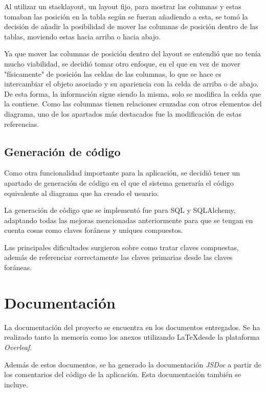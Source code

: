 Al utilizar un stacklayout, un layout fijo, para mostrar las columnas y estas tomaban las posición en la tabla según se fueran añadiendo a esta, se tomó la decisión de añadir la posibilidad de mover las columnas de posición dentro de las tablas, moviendo estas hacia arriba o hacia abajo.

Ya que mover las columnas de posición dentro del layout se entendió que no tenía mucho viabilidad, se decidió tomar otro enfoque, en el que en vez de mover "físicamente" de posición las celdas de las columnas, lo que se hace es intercambiar el objeto asociado y su apariencia con la celda de arriba o de abajo. De esta forma, la información sigue siendo la misma, solo se modifica la celda que la contiene. Como las columnas tienen relaciones cruzadas con otros elementos del diagrama, uno de los apartados más destacados fue la modificación de estas referencias.

\subsection{Generación de código}

Como otra funcionalidad importante para la aplicación, se decidió tener un apartado de generación de código en el que el sistema generaría el código equivalente al diagrama que ha creado el usuario.

La generación de código que se implementó fue para SQL y SQLAlchemy, adaptando todas las mejoras mencionadas anteriormente para que se tengan en cuenta cosas como claves foráneas y uniques compuestos.

Las principales dificultades surgieron sobre como tratar claves compuestas, además de referenciar correctamente las claves primarias desde las claves foráneas.

\section{Documentación}

La documentación del proyecto se encuentra en los documentos entregados. Se ha realizado tanto la memoria como los anexos utilizando \LaTeX desde la plataforma \emph{Overleaf}.

Además de estos documentos, se ha generado la documentación \emph{JSDoc} a partir de los comentarios del código de la aplicación. Esta documentación también se incluye.